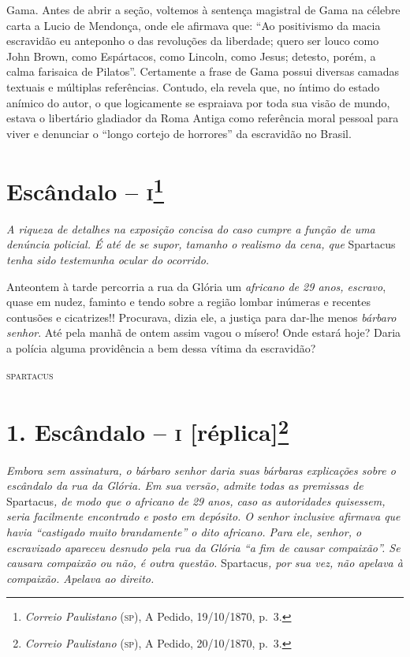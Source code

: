 \begin{argumento}
{Gama. Antes de abrir a seção, voltemos à sentença magistral de Gama na
célebre carta a Lucio de Mendonça, onde ele afirmava que: ``Ao
positivismo da macia escravidão eu anteponho o das revoluções da
liberdade; quero ser louco como John Brown, como Espártacos, como
Lincoln, como Jesus; detesto, porém, a calma farisaica de Pilatos''.
Certamente a frase de Gama possui diversas camadas textuais e múltiplas
referências. Contudo, ela revela que, no íntimo do estado anímico do
autor, o que logicamente se espraiava por toda sua visão de mundo,
estava o libertário gladiador da Roma Antiga como referência moral
pessoal para viver e denunciar o ``longo cortejo de horrores'' da
escravidão no Brasil.}
\end{argumento}

\chapter{Escândalo -- \textsc{i}\footnote{\emph{Correio Paulistano} (\textsc{sp}), A Pedido, 19/10/1870,
  p.~3.}} %

\begin{didascalia}
\emph{A riqueza de detalhes na exposição concisa do caso cumpre a função
de uma denúncia policial. É até de se supor, tamanho o realismo da cena,
que} Spartacus \emph{tenha sido testemunha ocular do ocorrido.}
\end{didascalia}

Anteontem à tarde percorria a rua da Glória um \emph{africano de 29
anos, escravo}, quase em nudez, faminto e tendo sobre a região lombar
inúmeras e recentes contusões e cicatrizes!! Procurava, dizia ele, a
justiça para dar-lhe menos \emph{bárbaro senhor}. Até pela manhã de
ontem assim vagou o mísero! Onde estará hoje? Daria a polícia alguma
providência a bem dessa vítima da escravidão?

\begin{flushright}
\textsc{spartacus}
\end{flushright}

\chapter{1. Escândalo -- \textsc{i} {[}réplica{]}\footnote{\emph{Correio Paulistano} (\textsc{sp}), A Pedido, 20/10/1870,
  p.~3.}} %

\begin{didascalia}
\emph{Embora sem assinatura, o bárbaro senhor daria suas bárbaras
explicações sobre o escândalo da rua da Glória. Em sua versão, admite
todas as premissas de} Spartacus\emph{, de modo que o africano de 29
anos, caso as autoridades quisessem, seria facilmente encontrado e posto
em depósito. O senhor inclusive afirmava que havia ``castigado muito
brandamente'' o dito africano. Para ele, senhor, o escravizado apareceu
desnudo pela rua da Glória ``a fim de causar compaixão''. Se causara
compaixão ou não, é outra questão.} Spartacus\emph{, por sua vez, não
apelava à compaixão. Apelava ao direito.}
\end{didascalia}


